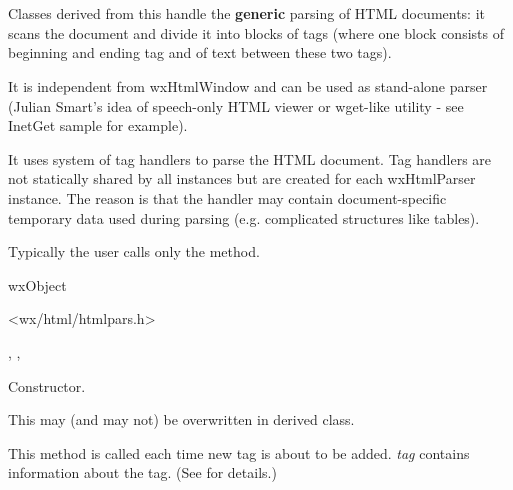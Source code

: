 %
%

\section{}\label{wxhtmlparser}

Classes derived from this handle the {\bf generic} parsing of HTML documents: it scans
the document and divide it into blocks of tags (where one block
consists of beginning and ending tag and of text between these
two tags).

It is independent from wxHtmlWindow and can be used as stand-alone parser
(Julian Smart's idea of speech-only HTML viewer or wget-like utility -
see InetGet sample for example).

It uses system of tag handlers to parse the HTML document. Tag handlers
are not statically shared by all instances but are created for each
wxHtmlParser instance. The reason is that the handler may contain
document-specific temporary data used during parsing (e.g. complicated
structures like tables).

Typically the user calls only the  method.


wxObject


<wx/html/htmlpars.h>


,
,


\label{wxhtmlparserwxhtmlparser}


Constructor.

\label{wxhtmlparseraddtag}


This may (and may not) be overwritten in derived class.

This method is called each time new tag is about to be added. 
{\it tag} contains information about the tag. (See 
for details.)

